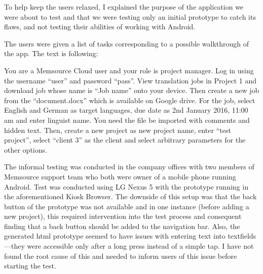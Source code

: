 To help keep the users relaxed, I explained the purpose of the application we were about to test and that we were testing only an initial prototype to catch its flaws, and not testing their abilities of working with Android.

The users were given a list of tasks corresponding to a possible walkthrough of the app. The text is following: 

You are a Memsource Cloud user and your role is project manager. Log in using the username ``user'' and password ``pass''. View translation jobs in Project 1 and download job whose name is ``Job name'' onto your device. Then create a new job from the ``document.docx'' which is available on Google drive. For the job, select English and German as target languages, due date as 2nd January 2016, 11:00 am and enter linguist name. You need the file be imported with comments and hidden text. Then, create a new project as new project name, enter ``test project'', select ``client 3'' as the client and select arbitrary parameters for the other options.

The informal testing was conducted in the company offices with two members of Memsource support team who both were owner of a mobile phone running Android. Test was conducted using LG Nexus 5 with the prototype running in the aforementioned Kiosk Browser. The downside of this setup was that the back button of the prototype was not available and in one instance (before adding a new project), this required intervention into the test process and consequent finding that a back button should be added to the navigation bar. Also, the generated html prototype seemed to have issues with entering text into textfields---they were accessible only after a long press instead of a simple tap. I have not found the root cause of this and needed to inform users of this issue before starting the test.

